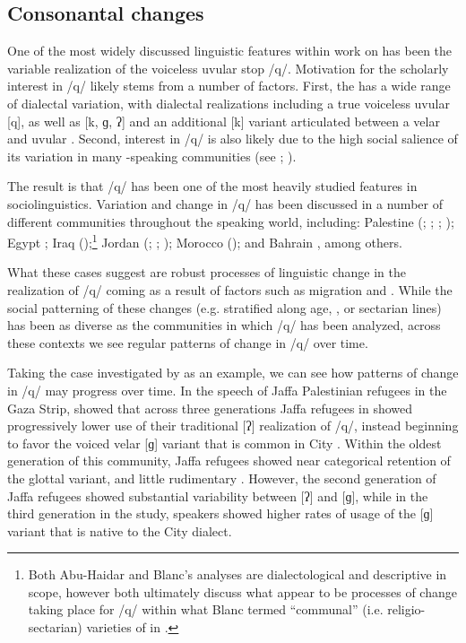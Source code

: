 \documentclass[output=paper]{langsci/langscibook}
\begin{document}
 
 \subsection{Consonantal changes}


One of the most widely discussed linguistic features within work on   has been the variable realization of the voiceless uvular stop /q/. Motivation for the scholarly interest in /q/ likely stems from a number of factors. First, the  has a wide range of dialectal variation, with dialectal realizations including a true voiceless uvular [q], as well as [k, ɡ, ʔ] and an additional [k] variant articulated between a velar and uvular \citep{Shahin2011}. Second, interest in /q/ is also likely due to the high social salience of its variation in many -speaking communities (see \citealt{Hachimi2012}; \citealt{CotterHoresh2015}). 

  The result is that /q/ has been one of the most heavily studied features in  sociolinguistics. Variation and change in /q/ has been discussed in a number of different communities throughout the  speaking world, including: Palestine (\citealt{AbdEl-Jawad1987}; \citealt{Al-Shareef2002}; \citealt{CotterHoresh2015}; \citealt{Cotter2016}); Egypt \citep{Haeri1997}; Iraq (\citealt{Blanc1964,Abu-Haidar1991});\footnote{Both Abu-Haidar and Blanc’s analyses are dialectological and descriptive in scope, however both ultimately discuss what appear to be processes of change taking place for /q/ within what Blanc termed “communal” (i.e. religio-sectarian) varieties of  in .}  Jordan (\citealt{AbdEl-Jawad1981}; \citealt{Al-Wer2007}; \citealt{Al-WerHerin2011}); Morocco (\citealt{Hachimi2007,Hachimi2012}); and Bahrain \citep{Holes1987}, among others. 

  What these cases suggest are robust processes of linguistic change in the realization of /q/ coming as a result of factors such as migration and . While the social patterning of these changes (e.g. stratified along age, , or sectarian lines) has been as diverse as the communities in which /q/ has been analyzed, across these contexts we see regular patterns of change in /q/ over time. 

  Taking the case investigated by \citet{Cotter2016} as an example, we can see how patterns of change in /q/ may progress over time. In the speech of Jaffa Palestinian refugees in the Gaza Strip, \citet{Cotter2016} showed that across three generations Jaffa refugees in  showed progressively lower use of their traditional [ʔ] realization of /q/, instead beginning to favor the voiced velar [ɡ] variant that is common in  City . Within the oldest generation of this community, Jaffa refugees showed near categorical retention of the glottal variant, and little rudimentary . However, the second generation of Jaffa refugees showed substantial variability between [ʔ] and [ɡ], while in the third generation in the study, speakers showed higher rates of usage of the [ɡ] variant that is native to the  City dialect. 
\end{document}
